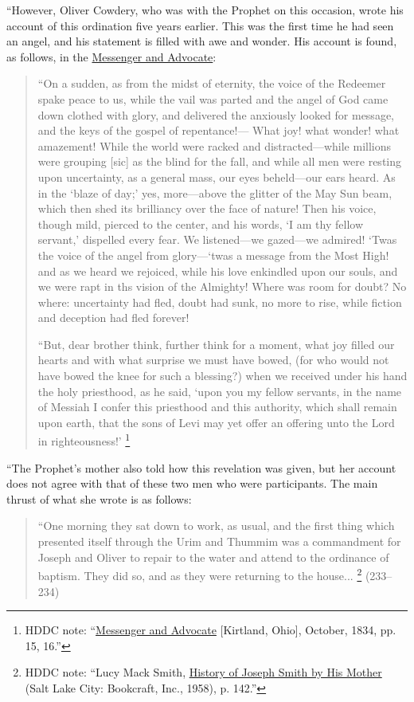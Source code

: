 			\noindent ``However, Oliver Cowdery, who was with the Prophet on this occasion, wrote his account of this ordination five years earlier. This was the first time he had seen an angel, and his statement is filled with awe and wonder. His account is found, as follows, in the \uline{Messenger and Advocate}:
			
				\begin{quote}
					``On a sudden, as from the midst of eternity, the voice of the Redeemer spake peace to us, while the vail was parted and the angel of God came down clothed with glory, and delivered the anxiously looked for message, and the keys of the gospel of repentance!--- What joy! what wonder! what amazement! While the world were racked and distracted---while millions were grouping [sic] as the blind for the fall, and while all men were resting upon uncertainty, as a general mass, our eyes beheld---our ears heard. As in the `blaze of day;' yes, more---above the glitter of the May Sun beam, which then shed its brilliancy over the face of nature! Then his voice, though mild, pierced to the center, and his words, `I am thy fellow servant,' dispelled every fear. We listened---we gazed---we admired! `Twas the voice of the angel from glory---`twas a message from the Most High! and as we heard we rejoiced, while his love enkindled upon our souls, and we were rapt in ths vision of the Almighty! Where was room for doubt? No where: uncertainty had fled, doubt had sunk, no more to rise, while fiction and deception had fled forever!
					
					``But, dear brother think, further think for a moment, what joy filled our hearts and with what surprise we must have bowed, (for who would not have bowed the knee for such a blessing?) when we received under his hand the holy priesthood, as he said, `upon you my fellow servants, in the name of Messiah I confer this priesthood and this authority, which shall remain upon earth, that the sons of Levi may yet offer an offering unto the Lord in righteousness!'%
						\footnote{%
							HDDC note: ``\uline{Messenger and Advocate} [Kirtland, Ohio], October, 1834, pp. 15, 16.''
							}
				\end{quote}
			
			``The Prophet's mother also told how this revelation was given, but her account does not agree with that of these two men who were participants. The main thrust of what she wrote is as follows:
			
				\begin{quote}
					``One morning they sat down to work, as usual, and the first thing which presented itself through the Urim and Thummim was a commandment for Joseph and Oliver to repair to the water and attend to the ordinance of baptism. They did so, and as they were returning to the house...%
						\footnote{%
							HDDC note: ``Lucy Mack Smith, \uline{History of Joseph Smith by His Mother} (Salt Lake City: Bookcraft, Inc., 1958), p. 142.''
							}%
					(233--234)
				\end{quote}
			
